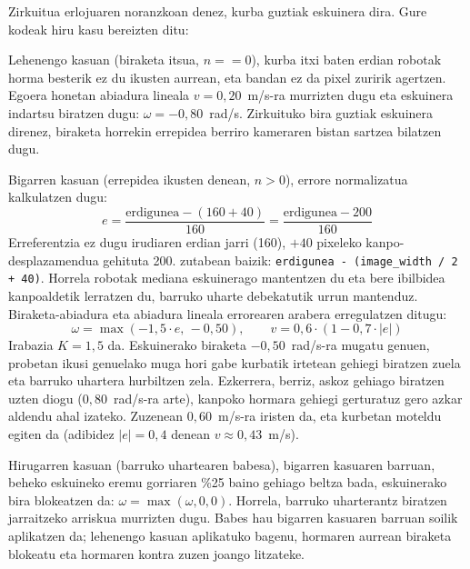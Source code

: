 Zirkuitua erlojuaren noranzkoan denez, kurba guztiak eskuinera dira. Gure kodeak hiru kasu bereizten ditu:

Lehenengo kasuan (biraketa itsua, $n == 0$), kurba itxi baten erdian robotak horma besterik ez du ikusten aurrean, eta bandan ez da pixel zuririk agertzen. Egoera honetan abiadura lineala $v = 0{,}20$~m/s-ra murrizten dugu eta eskuinera indartsu biratzen dugu: $\omega = -0{,}80$~rad/s. Zirkuituko bira guztiak eskuinera direnez, biraketa horrekin errepidea berriro kameraren bistan sartzea bilatzen dugu.

Bigarren kasuan (errepidea ikusten denean, $n > 0$), errore normalizatua kalkulatzen dugu:
\[
  e = \frac{\text{erdigunea} - (160 + 40)}{160} = \frac{\text{erdigunea} - 200}{160}
\]
Erreferentzia ez dugu irudiaren erdian jarri (160), $+40$ pixeleko kanpo-desplazamendua gehituta 200. zutabean baizik: \texttt{erdigunea - (image\_width / 2 + 40)}. Horrela robotak mediana eskuinerago mantentzen du eta bere ibilbidea kanpoaldetik lerratzen du, barruko uharte debekatutik urrun mantenduz. Biraketa-abiadura eta abiadura lineala errorearen arabera erregulatzen ditugu:
\[
  \omega = \max(-1{,}5 \cdot e,\, -0{,}50), \qquad v = 0{,}6 \cdot (1 - 0{,}7 \cdot |e|)
\]
Irabazia $K = 1{,}5$ da. Eskuinerako biraketa $-0{,}50$~rad/s-ra mugatu genuen, probetan ikusi genuelako muga hori gabe kurbatik irtetean gehiegi biratzen zuela eta barruko uhartera hurbiltzen zela. Ezkerrera, berriz, askoz gehiago biratzen uzten diogu ($0{,}80$~rad/s-ra arte), kanpoko hormara gehiegi gerturatuz gero azkar aldendu ahal izateko. Zuzenean $0{,}60$~m/s-ra iristen da, eta kurbetan moteldu egiten da (adibidez $|e| = 0{,}4$ denean $v \approx 0{,}43$~m/s).

Hirugarren kasuan (barruko uhartearen babesa), bigarren kasuaren barruan, beheko eskuineko eremu gorriaren \%25 baino gehiago beltza bada, eskuinerako bira blokeatzen da: $\omega = \max(\omega, 0{,}0)$. Horrela, barruko uharterantz biratzen jarraitzeko arriskua murrizten dugu. Babes hau bigarren kasuaren barruan soilik aplikatzen da; lehenengo kasuan aplikatuko bagenu, hormaren aurrean biraketa blokeatu eta hormaren kontra zuzen joango litzateke.

